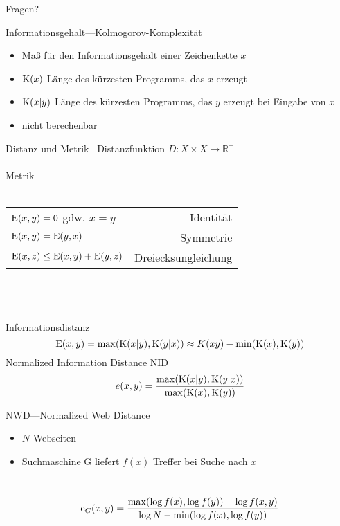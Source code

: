 \documentclass[aspectratio=1610]{beamer}
\newcommand{\K}[1]{\textnormal{K}{(#1)}}
\newcommand{\E}[1]{\textnormal{E}{(#1)}}
\newcommand{\D}[1]{\textnormal{E}{(#1)}}
\newcommand{\f}[1]{\ensuremath{f(#1)}}
\begin{document}
\begin{frame}{Fragen?}
\end{frame}

\begin{frame}{Informationsgehalt---Kolmogorov-Komplexität}
\begin{itemize}
\item Maß für den Informationsgehalt einer Zeichenkette $x$
\item $\K{x}$ Länge des kürzesten Programms, das $x$ erzeugt
\item $\K{x|y}$ Länge des kürzesten Programms, das $y$ erzeugt bei Eingabe von $x$
\item nicht berechenbar
\end{itemize}
\end{frame}

\begin{frame}{Distanz und Metrik~\cite{normalizedinformationdistance}}
Distanzfunktion $D: X \times  X \rightarrow \mathbb{R}^+$\\
\pause
~\\
Metrik\\~\\
\begin{tabular}{lr}
$\D{x,y} = 0$ gdw. $x = y$			&Identität\\
$\D{x,y} = \D{y,x}$					&Symmetrie\\
$\D{x,z} \leq \D{x,y} + \D{y,z}$	&Dreiecksungleichung\\
\end{tabular}\\
\pause
~\\~\\Informationsdistanz
\[\E{x,y} = \max(\K{x|y},\K{y|x}) \approx K(xy) - \min(\K{x},\K{y}) \]
\pause
Normalized Information Distance NID\\
\[e(x,y) = \frac{\max(\K{x|y},\K{y|x})}{\max(\K{x},\K{y})} \]
\end{frame}

\begin{frame}{NWD---Normalized Web Distance}
\begin{itemize}
\item $N$ Webseiten
\item Suchmaschine G liefert $\f{x}$ Treffer bei Suche nach $x$
\end{itemize}
~\\
\[\textnormal{e}_G(x,y) = \frac
{\max(\log \f{x}, \log \f{y})- \log \f{x,y}}
{\log N - \min(\log \f{x}, \log \f{y})}
\]
\end{frame}
\end{document}

